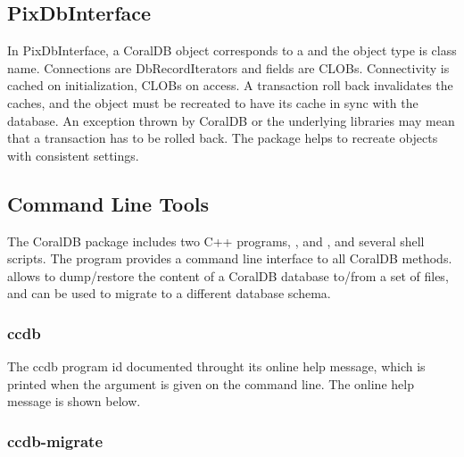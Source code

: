 \clearpage
\subsection{PixDbInterface}
\label{PixDbInterface}


In PixDbInterface, a CoralDB object corresponds to a  and
the object type is class name.  Connections are DbRecordIterators and fields are
CLOBs.  Connectivity is cached on initialization, CLOBs on
access.  A transaction roll back invalidates the caches, and the
 object must be recreated to have its cache in
sync with the database.  
An exception thrown by CoralDB or the underlying libraries may mean
that a transaction has to be rolled back.
The  package
helps to recreate  objects with consistent
settings.

\clearpage
\subsection{Command Line Tools}


The CoralDB package includes two C++ programs, , and
, and several shell scripts.  The  program provides a command
line interface to all CoralDB methods.   allows to
dump/restore the content of a CoralDB database to/from a set of
files, and can be used to migrate to a different database schema.


\subsubsection{ccdb}

The ccdb program id documented throught its online help message,
which is printed when the  argument is given on the
command line.  The online help message is shown below.





\clearpage
\subsubsection{ccdb-migrate}

